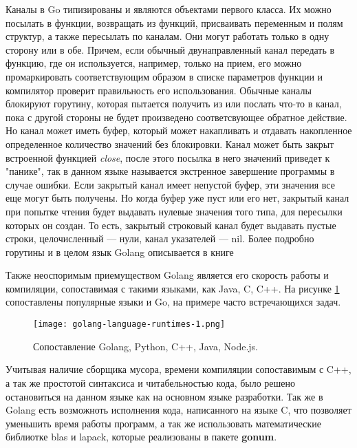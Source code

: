 Каналы в Go типизированы и являются объектами первого класса. Их можно посылать в функции, возвращать из функций, присваивать переменным и полям структур, а также пересылать по каналам. Они могут работать только в одну сторону или в обе. Причем, если обычный двунаправленный канал передать в функцию, где он используется, например, только на прием, его можно промаркировать соответствующим образом в списке параметров функции и компилятор проверит правильность его использования. Обычные каналы блокируют горутину, которая пытается получить из или послать что-то в канал, пока с другой стороны не будет произведено соответсвующее обратное действие. Но канал может иметь буфер, который может накапливать и отдавать накопленное определенное количество значений без блокировки. Канал может быть закрыт встроенной функцией \textit{close}, после этого посылка в него значений приведет к "панике", так в данном языке называется экстренное завершение программы в случае ошибки. Если закрытый канал имеет непустой буфер, эти значения все еще могут быть получены. Но когда буфер уже пуст или его нет, закрытый канал при попытке чтения будет выдавать нулевые значения того типа, для пересылки которых он создан. То есть, закрытый строковый канал будет выдавать пустые строки, целочисленный — нули, канал указателей — nil. Более подробно горутины и в целом язык Golang описывается в книге \cite{ProgrammingInGo}

Также неоспоримым приемуществом Golang является его скорость работы и компиляции, сопоставимая с такими языками, как Java, C, C++. На рисунке \ref{fig:govs} сопоставлены популярные языки и Go, на примере часто встречающихся задач.

\begin{figure}[h]
    \centering
    \texttt{[image: golang-language-runtimes-1.png]}
    \caption{Сопоставление Golang, Python, C++, Java, Node.js.}
    \label{fig:govs}
\end{figure}

Учитывая наличие сборщика мусора, времени компиляции сопоставимым с C++, а так же простотой синтаксиса и читабельностью кода, было решено остановиться на данном языке как на основном языке разработки. Так же в Golang есть возможноть исполнения кода, написанного на языке C, что позволяет уменьшить время работы программ, а так же использовать математические библиотке blas и lapack, которые реализованы в пакете \textbf{gonum}\cite{GoNum}. 